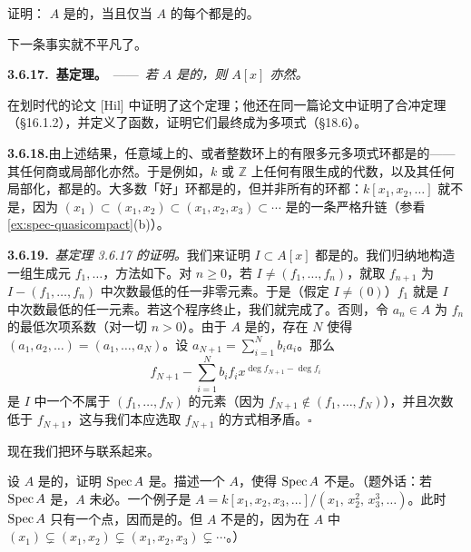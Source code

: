 \begin{exercise}[重要练习]\label{ex:noetherian-finitely-generated-ideals}
证明：\trRing{} $A$ 是\trNoetherian{}的，当且仅当 $A$ 的每个\trIdeal{}都是\trFinitelyGenerated{}的。
\end{exercise}

下一条事实就不平凡了。

\textbf{3.6.17.\ \trHilbert{}基定理。}\ ——\ \emph{若 $A$ 是\trNoetherian{}的，则 $A[x]$ 亦然。}

\trHilbert{}在划时代的论文 [Hil] 中证明了这个定理；他还在同一篇论文中证明了\trHilbert{}合冲定理（\S16.1.2），并定义了\trHilbert{}函数，证明它们最终成为多项式（\S18.6）。

\textbf{3.6.18.}\quad 由上述结果，任意域上的、或者整数环上的有限多元多项式环都是\trNoetherian{}的——其任何商或局部化亦然。于是例如，$k$ 或 $\mathbb{Z}$ 上任何有限生成的代数，以及其任何局部化，都是\trNoetherian{}的。大多数「好」环都是\trNoetherian{}的，但并非所有的环都\trNoetherian：$k[x_1,x_2,\dots]$ 就不是，因为 $(x_1)\subset(x_1,x_2)\subset(x_1,x_2,x_3)\subset\cdots$ 是\trIdeal{}的一条严格升链（参看\cref{ex:spec-quasicompact}(b)）。

\textbf{3.6.19.}\ \emph{\trHilbert{}基定理 3.6.17 的证明。}\quad 我们来证明\trIdeal{} $I\subset A[x]$ 都是\trFinitelyGenerated{}的。我们归纳地构造一组生成元 $f_1,\dots$，方法如下。对 $n\ge 0$，若 $I\neq(f_1,\dots,f_n)$，就取 $f_{n+1}$ 为 $I-(f_1,\dots,f_n)$ 中次数最低的任一非零元素。于是（假定 $I\neq(0)$）$f_1$ 就是 $I$ 中次数最低的任一元素。若这个程序终止，我们就完成了。否则，令 $a_n\in A$ 为 $f_n$ 的最低次项系数（对一切 $n>0$）。由于 $A$ 是\trNoetherian{}的，存在 $N$ 使得 $(a_1,a_2,\dots)=(a_1,\dots,a_N)$。设 $a_{N+1}=\sum_{i=1}^{N}b_ia_i$。那么
\[
f_{N+1}-\sum_{i=1}^{N}b_if_ix^{\deg f_{N+1}-\deg f_i}
\]
是 $I$ 中一个不属于 $(f_1,\dots,f_N)$ 的元素（因为 $f_{N+1}\notin(f_1,\dots,f_N)$），并且次数低于 $f_{N+1}$，这与我们本应选取 $f_{N+1}$ 的方式相矛盾。\hfill$\square$

现在我们把\trNoetherian{}环与\trNoetherian{}\trTopologicalSpace{}联系起来。

\begin{exercise}\label{ex:noetherian-ring-spec-noetherian}
设 $A$ 是\trNoetherian{}的，证明 $\operatorname{Spec} A$ 是\trNoetherian{}\trTopologicalSpace。描述一个\trRing{} $A$，使得 $\operatorname{Spec} A$ 不是\trNoetherian{}\trTopologicalSpace。（题外话：若 $\operatorname{Spec} A$ 是\trNoetherian{}\trTopologicalSpace，$A$ 未必\trNoetherian。一个例子是 $A=k[x_1,x_2,x_3,\dots]/(x_1,\,x_2^2,\,x_3^3,\dots)$。此时 $\operatorname{Spec} A$ 只有一个点，因而是\trNoetherian{}的。但 $A$ 不是\trNoetherian{}的，因为在 $A$ 中 $(x_1)\subsetneq(x_1,x_2)\subsetneq(x_1,x_2,x_3)\subsetneq\cdots$。）
\end{exercise}

